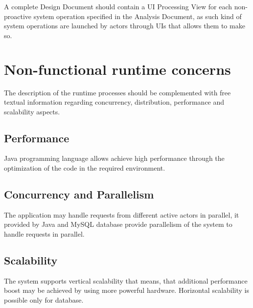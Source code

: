 A complete Design Document should contain a UI Processing View for each
non-proactive system operation specified in the \msrmessir Analysis Document, as
such kind of system operations are launched by actors through UIs that allows
them to make so. 



% 
%  
% 
% 
% 
% 



\section{Non-functional runtime concerns}
The description of the runtime processes should be complemented with free
textual information regarding concurrency, distribution, performance and scalability aspects.


\subsection{Performance}
Java programming language allows achieve high performance  through 
the optimization of the code in the required environment.


\subsection{Concurrency and Parallelism}
The application may handle requests from different active actors in parallel, 
it provided by Java and MySQL database provide parallelism of the system 
to handle requests in parallel.



\subsection{Scalability}
The system supports vertical scalability that means, that additional performance 
boost may be achieved by using more powerful hardware. Horizontal scalability is
possible only for database.






